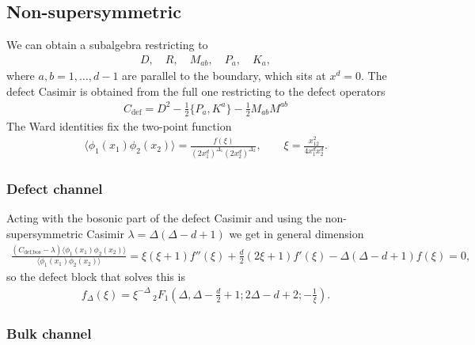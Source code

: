 \documentclass[letterpaper]{article}
\let\Oldsubsection\subsection
\renewcommand{\subsection}{\FloatBarrier\Oldsubsection}
\let\Oldsubsubsection\subsubsection
\renewcommand{\subsubsection}{\FloatBarrier\Oldsubsubsection}
\begin{document}
\subsection{Non-supersymmetric}

We can obtain a subalgebra restricting to
\begin{align}
 D, \quad
 R, \quad
 M_{ab}, \quad
 P_{a}, \quad
 K_{a},
\end{align}
where $a,b = 1, \ldots, d-1$ are parallel to the boundary, which sits at $x^d = 0$.
The defect Casimir is obtained from the full one restricting to the defect operators
\begin{align}
 C_{\text{def}} = 
    D^2
  - \frac12 \{ P_{a}, K^{a} \}
  - \frac{1}{2} M_{ab} M^{ab}
\end{align}
The Ward identities fix the two-point function
\begin{align}
 \langle \phi_1(x_1) \phi_2(x_2) \rangle
 = \frac{f(\xi)}{(2x_1^d)^{\Delta_1} (2x_2^d)^{\Delta_2}}, \qquad
 \xi = \frac{x_{12}^2}{4 x_1^{d} x_2^{d}}.
\end{align}

\subsubsection{Defect channel}

Acting with the bosonic part of the defect Casimir and using the non-supersymmetric Casimir $\lambda = \Delta(\Delta - d + 1)$ we get in general dimension
\begin{align}
 \frac{
 \left( C_{\text{def,bos}} - \lambda \right) \langle \phi_1(x_1) \phi_2(x_2)\rangle
 }{\langle \phi_1(x_1) \phi_2(x_2)\rangle}
 = \xi  (\xi +1) f''(\xi ) 
 + \frac{d}{2} (2 \xi +1) f'(\xi )
 - \Delta (\Delta - d + 1) f(\xi )
 = 0,
\end{align}
so the defect block that solves this is
\begin{align}
 f_\Delta(\xi) =
 \xi ^{-\Delta } \, _2F_1\left(\Delta ,\Delta-\frac{d}{2} + 1;2 \Delta -d + 2; -\frac{1}{\xi }\right).
\end{align}

\subsubsection{Bulk channel}
\end{document}
